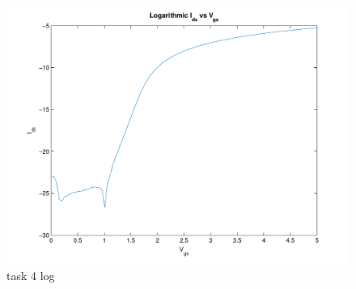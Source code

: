\documentclass[11pt,a4paper]{report}
\begin{document}
\begin{figure}[ht!]
\caption{task 4 log}
\centering
\includegraphics[scale=1]{task4-log-eps-converted-to.pdf}
\end{figure}
\end{document}
